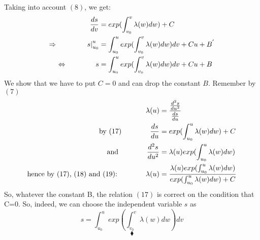 Taking into account $(8)$, we get:
\begin{align}
\dv{s}{v}  &= exp(\int^v_{v_0} \lambda (w)dw) + C\\
\Rightarrow \quad\quad\quad\quad  \left. s \right|^u_{u_0} &=\int^u_{u_0}  exp(\int^v_{v_0} \lambda (w)dw)dv +Cu + B^{'}\\
\Leftrightarrow  \quad\quad\quad\quad  s  &=\int^u_{u_0}  exp(\int^v_{v_0} \lambda (w)dw)dv +Cu + B
\end{align}
We show that we have to put $C=0$ and can drop the constant $B$. Remember by $(7)$
\begin{align}
\lambda (u) &= \frac{\dv[2]{s}{u}}{\dv{s}{u}}\\
\text{by (17)} \quad\quad\quad\quad  \dv{s}{u}  &=exp(\int^u_{u_0} \lambda (w)dw) +C\\
\text{and}\quad\quad\quad\quad  \dv[2]{s}{u}  &= \lambda (u) exp(\int^u_{u_0} \lambda (w)dw) \\
\text{hence by (17), (18) and (19):} \quad\quad\quad\quad  \lambda (u)&= \frac{\lambda (u) exp(\int^u_{u_0} \lambda (w)dw)}{exp(\int^u_{u_0} \lambda (w)dw) +C}
\end{align}
So, whatever the constant B, the relation $(17)$ is correct on the condition that C=0. 
So, indeed, we can choose the independent variable $s$ as
$$s  =\int^u_{u_0}  exp(\int^v_{v_0} \lambda (w)dw)dv $$ 
$$\blacklozenge$$
\newpage

